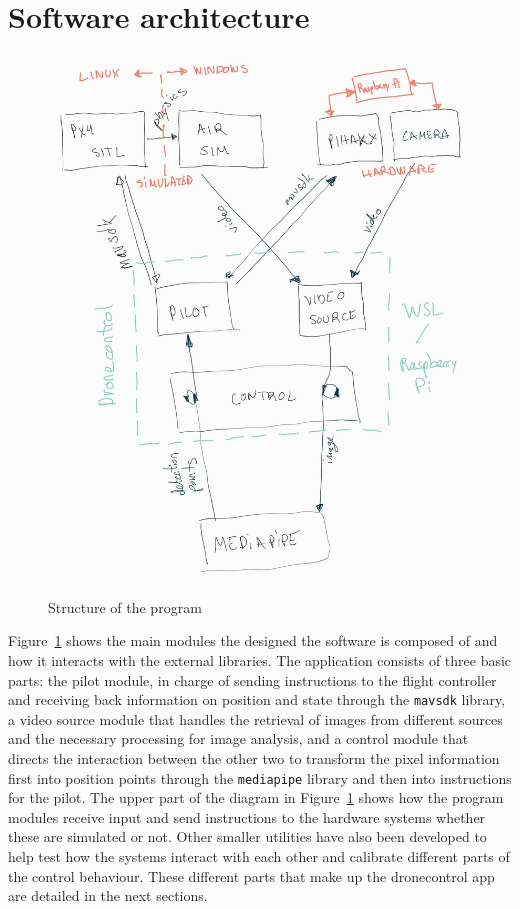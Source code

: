 \section{Software architecture}

\begin{figure}
  \centering
  \includegraphics[width=12cm, keepaspectratio]{img/code_diagram.jpg}
  \caption{Structure of the program}\label{fig:architecture}
\end{figure}

Figure~\ref{fig:architecture} shows the main modules the designed the software is composed of and how it interacts with the external libraries.
The application consists of three basic parts: 
the pilot module, in charge of sending instructions to the flight controller and receiving back information on position and state through the \verb|mavsdk| library, 
a video source module that handles the retrieval of images from different sources and the necessary processing for image analysis, 
and a control module that directs the interaction between the other two to transform the pixel information first into position points through the \verb|mediapipe| library and then into instructions for the pilot.
The upper part of the diagram in Figure~\ref{fig:architecture} shows how the program modules receive input and send instructions to the hardware systems whether these are simulated or not.
Other smaller utilities have also been developed to help test how the systems interact with each other and calibrate different parts of the control behaviour.
These different parts that make up the dronecontrol app are detailed in the next sections.

